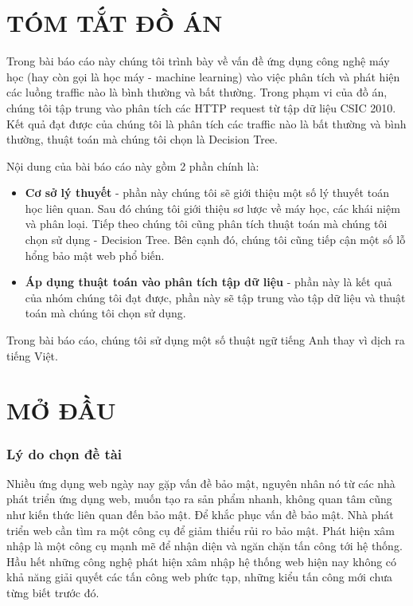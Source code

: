 \documentclass[../main-report.tex]{subfiles}
\begin{document}
\part*{TÓM TẮT ĐỒ ÁN}
Trong bài báo cáo này chúng tôi trình bày về vấn đề ứng dụng công nghệ máy học (hay còn gọi là học máy - machine learning) vào việc phân tích và phát hiện các luồng traffic nào là bình thường và bất thường. Trong phạm vi của đồ án, chúng tôi tập trung vào phân tích các HTTP request từ tập dữ liệu CSIC 2010. Kết quả đạt được của chúng tôi là phân tích các traffic nào là bất thường và bình thường, thuật toán mà chúng tôi chọn là Decision Tree.

Nội dung của bài báo cáo này gồm 2 phần chính là:

\begin{itemize}
\item \textbf{Cơ sở lý thuyết} - phần này chúng tôi sẽ giới thiệu một số lý thuyết toán học liên quan. Sau đó chúng tôi giới thiệu sơ lược về máy học, các khái niệm và phân loại. Tiếp theo chúng tôi cũng phân tích thuật toán mà chúng tôi chọn sử dụng - Decision Tree. Bên cạnh đó, chúng tôi cũng tiếp cận một số lỗ hổng bảo mật web phổ biến.
\item \textbf{Áp dụng thuật toán vào phân tích tập dữ liệu} - phần này là kết quả của nhóm chúng tôi đạt được, phần này sẽ tập trung vào tập dữ liệu và thuật toán mà chúng tôi chọn sử dụng.
\end{itemize}

Trong bài báo cáo, chúng tôi sử dụng một số thuật ngữ tiếng Anh thay vì dịch ra tiếng Việt.
\newpage
\part*{MỞ ĐẦU}
\section*{Lý do chọn đề tài}
Nhiều ứng dụng web ngày nay gặp vấn đề bảo mật, nguyên nhân nó từ các nhà phát triển ứng dụng web, muốn tạo ra sản phẩm nhanh, không quan tâm cũng như kiến thức liên quan đến bảo mật. Để khắc phục vấn đề bảo mật. Nhà phát triển web cần tìm ra một công cụ để giảm thiểu rủi ro bảo mật. Phát hiện xâm nhập là một công cụ mạnh mẽ để nhận diện và ngăn chặn tấn công tới hệ thống. Hầu hết những công nghệ phát hiện xâm nhập hệ thống web hiện nay không có khả năng giải quyết các tấn công web phức tạp, những kiểu tấn công mới chưa từng biết trước đó.
\end{document}
